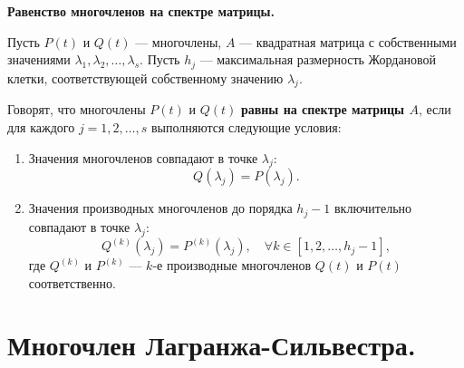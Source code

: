 \begin{shdef}
    \begin{definition}
        \textbf{Равенство многочленов на спектре матрицы.} 
        
        Пусть \( P(t) \) и \( Q(t) \) — многочлены, \( A \) — квадратная матрица с собственными значениями \( \lambda_1, \lambda_2, \ldots, \lambda_s \). Пусть \( h_j \) — максимальная размерность Жордановой клетки, соответствующей собственному значению \( \lambda_j \). 

        Говорят, что многочлены \( P(t) \) и \( Q(t) \) \textbf{равны на спектре матрицы \( A \)}, если для каждого \( j = 1, 2, \ldots, s \) выполняются следующие условия:
        \begin{enumerate}
            \item Значения многочленов совпадают в точке \( \lambda_j \):
            \[
            Q(\lambda_j) = P(\lambda_j).
            \]
            \item Значения производных многочленов до порядка \( h_j - 1 \) включительно \\совпадают в точке \( \lambda_j \):
            \[
            Q^{(k)}(\lambda_j) = P^{(k)}(\lambda_j), \quad \forall k \in [1, 2, \ldots, h_j - 1],
            \]
            где \( Q^{(k)} \) и \( P^{(k)} \) — \( k \)-е производные многочленов \( Q(t) \) и \( P(t) \) соответственно.
        \end{enumerate}
    \end{definition}
\end{shdef}

\section{Многочлен Лагранжа-Сильвестра.}


